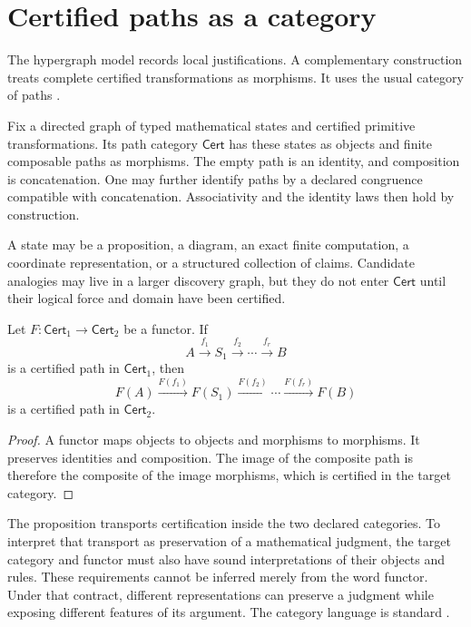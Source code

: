 \section{Certified paths as a category}
\label{PPT:sec:old6}

The hypergraph model records local justifications. A complementary construction treats complete certified transformations as morphisms. It uses the usual category of paths \cite{PPT:maclane}.

\begin{PPTdefinition}
\label{PPT:res:6:1}
Fix a directed graph of typed mathematical states and certified primitive transformations. Its path category $\mathsf{Cert}$ has these states as objects and finite composable paths as morphisms. The empty path is an identity, and composition is concatenation. One may further identify paths by a declared congruence compatible with concatenation. Associativity and the identity laws then hold by construction.
\end{PPTdefinition}

A state may be a proposition, a diagram, an exact finite computation, a coordinate representation, or a structured collection of claims. Candidate analogies may live in a larger discovery graph, but they do not enter $\mathsf{Cert}$ until their logical force and domain have been certified.

\begin{PPTproposition}
\label{PPT:res:6:2}
Let $F:\mathsf{Cert}_1\to\mathsf{Cert}_2$ be a functor. If
\[
A\xrightarrow{f_1}S_1\xrightarrow{f_2}\cdots\xrightarrow{f_r}B
\]
is a certified path in $\mathsf{Cert}_1$, then
\[
F(A)\xrightarrow{F(f_1)}F(S_1)\xrightarrow{F(f_2)}\cdots\xrightarrow{F(f_r)}F(B)
\]
is a certified path in $\mathsf{Cert}_2$.
\end{PPTproposition}

\begin{proof}
A functor maps objects to objects and morphisms to morphisms. It preserves identities and composition. The image of the composite path is therefore the composite of the image morphisms, which is certified in the target category.
\end{proof}

The proposition transports certification inside the two declared categories. To interpret that transport as preservation of a mathematical judgment, the target category and functor must also have sound interpretations of their objects and rules. These requirements cannot be inferred merely from the word functor. Under that contract, different representations can preserve a judgment while exposing different features of its argument. The category language is standard \cite{PPT:maclane}.

